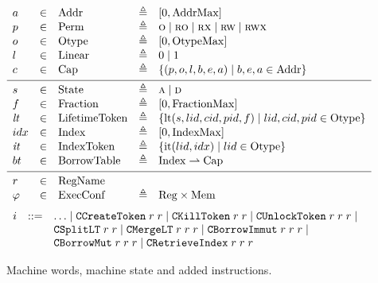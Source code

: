 \begin{figure}
\arraycolsep=3pt
\[
\begin{array}{lllll}
  a & \in & \X{Addr} & \eqdef & [0, \X{AddrMax}] \\
  p & \in & \X{Perm} & \eqdef & \perm{o} \mid \perm{ro} \mid \perm{rx} \mid \perm{rw} \mid \perm{rwx}\\
  o & \in & \X{Otype} & \eqdef & [0, \X{OtypeMax}] \\
  l & \in & \X{Linear} & \eqdef & 0 \mid 1 \\
  c & \in & \X{Cap} & \eqdef & \{(p, o, l, b, e, a) \mid b, e, a \in \X{Addr}\} \\[.3em] \hline\rule{0pt}{2.6ex}
  s & \in & \X{State} & \eqdef & \perm{a} \mid \perm{d}\\
  f & \in & \X{Fraction} & \eqdef & [0, \X{FractionMax}]\\
  \V{lt} & \in & \X{LifetimeToken} & \eqdef & \{\X{lt}(s, lid, cid, pid, f) \mid lid, cid, pid \in \X{Otype}\} \\
  idx & \in & \X{Index} & \eqdef & [0, \X{IndexMax}]\\
  \V{it} & \in & \X{IndexToken} & \eqdef & \left\{ \X{it}(lid, idx) \mid lid \in \X{Otype} \right\}\\
  bt & \in & \X{BorrowTable} & \eqdef & \X{Index} \rightharpoonup \X{Cap} \\[.3em] \hline\rule{0pt}{2.6ex}
  r & \in & \X{RegName} \\%
  \confv & \in & \X{ExecConf} & \eqdef & \X{Reg} \times \X{Mem}
\end{array}%
\]%
%
\[
\begin{array}{lll}
  i & \mathrel{::=} &\ldots \mid \texttt{CCreateToken}\; r \; r \mid
               \texttt{CKillToken}\; r \; r \mid
               \texttt{CUnlockToken}\; r\; r\; r \mid \\
               &&\texttt{CSplitLT}\; r\; r \mid
               \texttt{CMergeLT}\; r \; r \; r \mid
               \texttt{CBorrowImmut}\; r \; r \; r \mid \\
               &&\texttt{CBorrowMut}\; r \; r \; r \mid
               \texttt{CRetrieveIndex}\; r \; r \; r
\end{array}
\]
\caption{\label{fig:opsem_syntax}Machine words, machine state and added instructions.}
\end{figure}

